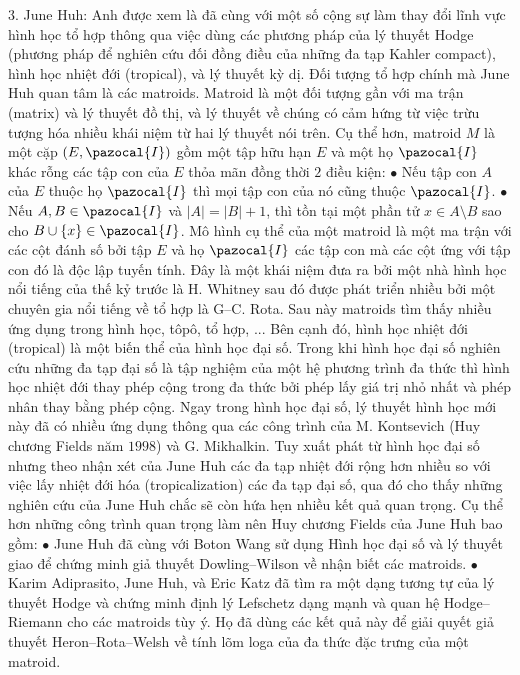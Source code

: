 \begin{multicols}{2}
	\vskip 0.1cm
	$3.$ June Huh: Anh được xem là đã cùng với một số cộng sự làm thay đổi lĩnh vực hình học tổ hợp thông qua việc dùng các phương pháp của lý thuyết Hodge (phương pháp để nghiên cứu đối đồng điều của những đa tạp Kahler compact), hình học nhiệt đới (tropical), và lý thuyết kỳ dị. Đối tượng tổ hợp chính mà June Huh quan tâm là các matroids. Matroid là một đối tượng gần với ma trận (matrix) và lý thuyết đồ thị, và lý thuyết về chúng có cảm hứng từ việc trừu tượng hóa nhiều khái niệm từ hai lý thuyết nói trên. Cụ thể hơn, matroid $M$ là một cặp $(E,\pazocal{I})$ gồm một tập hữu hạn $E$ và một họ $\pazocal{I}$ khác rỗng các tập con của $E$ thỏa mãn đồng thời $2$ điều kiện:
	\vskip 0.1cm
	$\bullet$ Nếu tập con $A$ của $E$ thuộc họ $\pazocal{I}$ thì mọi tập con của nó cũng thuộc $\pazocal{I}$.
	\vskip 0.1cm
	$\bullet$ Nếu $A, B \in \pazocal{I}$ và $|A| = |B| +1$, thì tồn tại một phần tử $x \in A \setminus B$ sao cho $B \cup \{x\} \in \pazocal{I}$.
	\vskip 0.1cm
	Mô hình cụ thể của một matroid là một ma trận với các cột đánh số bởi tập $E$ và họ $\pazocal{I}$ các tập con mà các cột ứng với tập con đó là độc lập tuyến tính.
	\vskip 0.1cm
	Đây là một khái niệm đưa ra bởi một nhà hình học nổi tiếng của thế kỷ trước là H. Whitney sau đó được phát triển nhiều bởi một chuyên gia nổi tiếng về tổ hợp là G--C. Rota. Sau này matroids tìm thấy nhiều ứng dụng trong hình học, tôpô, tổ hợp, ...
	\vskip 0.1cm
	Bên cạnh đó, hình học nhiệt đới (tropical) là một biến thể của hình học đại số. Trong khi hình học đại số nghiên cứu những đa tạp đại số là tập nghiệm của một hệ phương trình đa thức thì hình học nhiệt đới thay phép cộng trong đa thức bởi phép lấy giá trị nhỏ nhất và phép nhân thay bằng phép cộng. Ngay trong hình học đại số, lý thuyết hình học mới này đã có nhiều ứng dụng thông qua các công trình của M. Kontsevich (Huy chương Fields năm $1998$) và G. Mikhalkin. Tuy xuất phát từ hình học đại số nhưng theo nhận xét của June Huh các đa tạp nhiệt đới rộng hơn nhiều so với việc lấy nhiệt đới hóa (tropicalization) các đa tạp đại số, qua đó cho thấy những nghiên cứu của June Huh chắc sẽ còn hứa hẹn nhiều kết quả quan trọng.  
	\vskip 0.1cm
	Cụ thể hơn những công trình quan trọng làm nên Huy chương Fields của June Huh bao gồm:
	\vskip 0.1cm
	$\bullet$ June Huh đã cùng với Boton Wang sử dụng Hình học đại số và lý thuyết giao để chứng minh giả thuyết Dowling--Wilson về nhận biết các matroids. 
	\vskip 0.1cm
	$\bullet$ Karim Adiprasito, June Huh, và Eric Katz đã tìm ra một dạng tương tự của lý thuyết Hodge và chứng minh định lý Lefschetz dạng mạnh và quan hệ Hodge--Riemann cho các matroids tùy ý. Họ đã dùng các kết quả này để giải quyết giả thuyết Heron--Rota--Welsh về tính lõm loga của đa thức đặc trưng của một matroid. 

\end{multicols}
